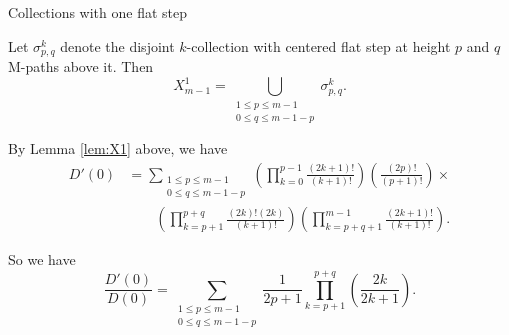 \documentclass[12pt,mathserif]{beamer}
\begin{document}
\begin{frame}[allowframebreaks]{Collections with one flat step}
\begin{lemma}\label{lem:X1}
Let $\sigma^k_{p,q}$ denote the disjoint $k$-collection with centered flat step at height $p$ and $q$ M-paths above it. Then
\begin{equation*}
X_{m-1}^1 = \bigcup\limits_{\substack{1\leq p \leq m-1 \\ 0\leq q \leq m - 1 -p}} \sigma^k_{p,q}.
\end{equation*}
\end{lemma}

\framebreak

By Lemma \ref{lem:X1} above, we have
\begin{align*}
D'(0) &= \sum\limits_{\substack{1\leq p\leq m-1\\0\leq q\leq m-1-p}}\left(\prod\limits_{k=0}^{p-1}\frac{(2k+1)!}{(k+1)!}\right)\left(\frac{(2p)!}{(p+1)!}\right) \times \\
&\qquad \left(\prod\limits_{k=p+1}^{p+q}\frac{(2k)!(2k)}{(k+1)!}\right)\left(\prod\limits_{k=p+q+1}^{m-1}\frac{(2k+1)!}{(k+1)!}\right).
\end{align*}

So we have
\begin{equation*}\label{eqn:D'/D}
\frac{D'(0)}{D(0)} = \sum\limits_{\substack{1\leq p \leq m-1 \\ 0 \leq q \leq m - 1 - p}}\frac{1}{2p+1}\prod\limits_{k=p+1}^{p+q}\left(\frac{2k}{2k+1}\right).
\end{equation*}

\end{frame}
\end{document}
